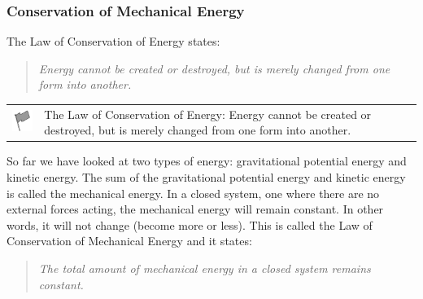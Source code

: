             \subsubsection{ Conservation of Mechanical Energy}
            \nopagebreak
        \label{m38786*id68454}The Law of Conservation of Energy states:\par 
        \label{m38786*id68458}
          \label{m38786*id68458!!!underscore!!!quote}\begin{quote}{\sl Energy cannot be created or destroyed, but is merely changed from one form into another.} %
    \end{quote}
        \par 
\label{m38786*fhsst!!!underscore!!!id1579}\begin{definition}
	  \begin{tabular*}{15 cm}{m{15 mm}m{}}
	\hspace*{-50pt}  \includegraphics[width=0.5in]{col11305.imgs/psflag2.png}   & \Definition{   \label{id2556212}\textbf{ Conservation of Energy }} { \label{m38786*meaningfhsst!!!underscore!!!id1579}
        \label{m38786*id68470}The Law of Conservation of Energy: Energy cannot be created or destroyed, but is merely changed from one form into another. \par 
         } 
      \end{tabular*}
      \end{definition}
        \label{m38786*id68483}So far we have looked at two types of energy: gravitational potential energy and kinetic energy. The sum of the gravitational potential energy and kinetic energy is called the mechanical energy. In a closed system, one where there are no external forces acting, the mechanical energy will remain constant. In other words, it will not change (become more or less). This is called the Law of Conservation of Mechanical Energy and it states:\par 
        \label{m38786*id68494}
          \label{m38786*id68494!!!underscore!!!quote}\begin{quote}{\sl The total amount of mechanical energy in a closed system remains constant.} %
    \end{quote}
        \par 
